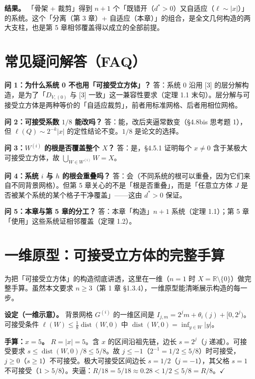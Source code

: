 \documentclass[a4paper,11pt,openany]{ctexbook}
\numberwithin{equation}{chapter}
\numberwithin{figure}{chapter}
\numberwithin{table}{chapter}
\begin{document}
\textbf{结果。} 「骨架 + 裁剪」得到 $n+1$ 个「既错开（$d^*>0$）又自适应（$\ell\sim|x|$）」的系统。这个「分离（第 3 章）+ 自适应（本章）」的组合，是全文几何构造的两大支柱，也是第 5 章相邻覆盖得以成立的全部前提。

\section{常见疑问解答（FAQ）}

\textbf{问 1：为什么系统 0 不也用「可接受立方体」？} 答：系统 0 沿用 [3] 的层分解构造，是为了「$D_{V,(0)}$ 与 [3] 一致」这一兼容性要求（定理 1.1 末句）。层分解与可接受立方体是两种等价的「自适应裁剪」，前者用标准网格、后者用相位网格。

\textbf{问 2：可接受系数 $1/8$ 能改吗？} 答：能，改后夹逼常数变（§4.8bis 思考题 1），但 $\ell(Q)\sim2^{-k}|x|$ 的定性结论不变。$1/8$ 是论文的选择。

\textbf{问 3：$W^{(i)}$ 的根是否覆盖整个 $X$？} 答：是，§4.5.1 证明每个 $x\neq0$ 含于某极大可接受立方体，故 $\bigcup_{W\in W^{(i)}}W=X$。

\textbf{问 4：系统 $i$ 与 $h$ 的根会重叠吗？} 答：会（不同系统的根可以重叠，因为它们来自不同背景网格）。但第 5 章关心的不是「根是否重叠」，而是「任意立方体 $J$ 是否被某个系统的某个格子干净覆盖」——这由 $d^*>0$ 保证。

\textbf{问 5：本章与第 5 章的分工？} 答：本章「构造」$n+1$ 系统（定理 1.1）；第 5 章「使用」这些系统证相邻覆盖（定理 1.2）。

\section{一维原型：可接受立方体的完整手算}

为把「可接受立方体」的构造彻底讲透，这里在一维（$n=1$ 时 $X=\mathbb R\setminus\{0\}$）做完整手算。虽然本文要求 $n\ge3$（第 1 章 §1.3.4），一维原型能清晰展示构造的每一步。

\textbf{设定（一维示意）。} 背景网格 $G^{(i)}$ 的一维区间是 $I_{j,m}=2^j m+\theta_i(j)+[0,2^j)$。可接受条件 $\ell(W)\le\frac18\operatorname{dist}(W,0)$ 中 $\operatorname{dist}(W,0)=\inf_{y\in W}|y|$。

\textbf{手算：$x=5$。} $R=|x|=5$。含 $x$ 的区间沿祖先链，边长 $s=2^j$（$j$ 递减）。可接受要求 $s\le\operatorname{dist}(W,0)/8\le5/8$。故 $j\le-1$（$2^{-1}=1/2\le5/8$）时可接受，$j\ge0$（$s\ge1$）不可接受。极大可接受区间边长 $s=1/2$（$j=-1$），其父格 $s=1$ 不可接受（$1>5/8$）。夹逼：$R/18=5/18\approx0.28<1/2\le5/8=R/8$。$\checkmark$
\end{document}
